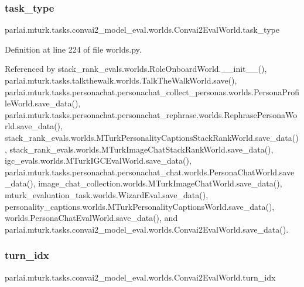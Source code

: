 \subsubsection{\texorpdfstring{task\+\_\+type}{task\_type}}
{\footnotesize\ttfamily parlai.\+mturk.\+tasks.\+convai2\+\_\+model\+\_\+eval.\+worlds.\+Convai2\+Eval\+World.\+task\+\_\+type}



Definition at line 224 of file worlds.\+py.



Referenced by stack\+\_\+rank\+\_\+evals.\+worlds.\+Role\+Onboard\+World.\+\_\+\+\_\+init\+\_\+\+\_\+(), parlai.\+mturk.\+tasks.\+talkthewalk.\+worlds.\+Talk\+The\+Walk\+World.\+save(), parlai.\+mturk.\+tasks.\+personachat.\+personachat\+\_\+collect\+\_\+personas.\+worlds.\+Persona\+Profile\+World.\+save\+\_\+data(), parlai.\+mturk.\+tasks.\+personachat.\+personachat\+\_\+rephrase.\+worlds.\+Rephrase\+Persona\+World.\+save\+\_\+data(), stack\+\_\+rank\+\_\+evals.\+worlds.\+M\+Turk\+Personality\+Captions\+Stack\+Rank\+World.\+save\+\_\+data(), stack\+\_\+rank\+\_\+evals.\+worlds.\+M\+Turk\+Image\+Chat\+Stack\+Rank\+World.\+save\+\_\+data(), igc\+\_\+evals.\+worlds.\+M\+Turk\+I\+G\+C\+Eval\+World.\+save\+\_\+data(), parlai.\+mturk.\+tasks.\+personachat.\+personachat\+\_\+chat.\+worlds.\+Persona\+Chat\+World.\+save\+\_\+data(), image\+\_\+chat\+\_\+collection.\+worlds.\+M\+Turk\+Image\+Chat\+World.\+save\+\_\+data(), mturk\+\_\+evaluation\+\_\+task.\+worlds.\+Wizard\+Eval.\+save\+\_\+data(), personality\+\_\+captions.\+worlds.\+M\+Turk\+Personality\+Captions\+World.\+save\+\_\+data(), worlds.\+Persona\+Chat\+Eval\+World.\+save\+\_\+data(), and parlai.\+mturk.\+tasks.\+convai2\+\_\+model\+\_\+eval.\+worlds.\+Convai2\+Eval\+World.\+save\+\_\+data().

\mbox{\label{classparlai_1_1mturk_1_1tasks_1_1convai2__model__eval_1_1worlds_1_1Convai2EvalWorld_acab4083943aae20eab9e3505276af50b}} 
\subsubsection{\texorpdfstring{turn\+\_\+idx}{turn\_idx}}
{\footnotesize\ttfamily parlai.\+mturk.\+tasks.\+convai2\+\_\+model\+\_\+eval.\+worlds.\+Convai2\+Eval\+World.\+turn\+\_\+idx}



